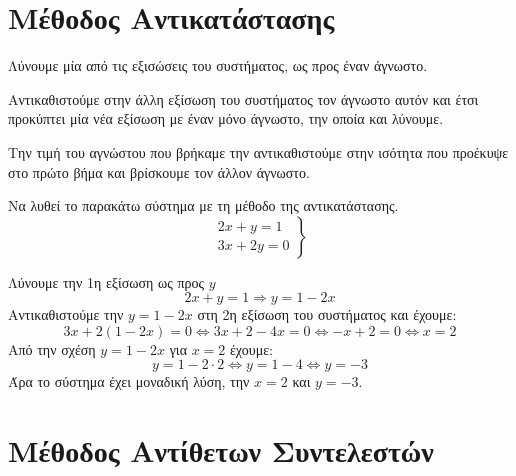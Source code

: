 \documentclass[a4paper,table]{report}
\begin{document}
\begin{center}
  \minibox{\large\bfseries \textcolor{Col1}{Γραμμικά Συστήματα 2 x 2}}
\end{center}

\vspace{\baselineskip}


\section*{Μέθοδος Αντικατάστασης}

\begin{mybox2}
  \item {}
\begin{myitemize}
  \item Λύνουμε μία από τις εξισώσεις του συστήματος, ως προς έναν άγνωστο.
  \item Αντικαθιστούμε στην άλλη εξίσωση του συστήματος τον άγνωστο αυτόν και έτσι 
    προκύπτει μία νέα εξίσωση με έναν μόνο άγνωστο, την οποία και λύνουμε.
  \item Την τιμή του αγνώστου που βρήκαμε την αντικαθιστούμε στην ισότητα που προέκυψε
    στο πρώτο βήμα και βρίσκουμε τον άλλον άγνωστο.
\end{myitemize}
\end{mybox2}

\begin{example} 
  Να λυθεί το παρακάτω σύστημα με τη μέθοδο της αντικατάστασης.
  \[
    \left.
      \begin{matrix}
        2x+y=1 \\
        3x+2y=0
      \end{matrix} 
    \right\} 
  \] 
\end{example}
\begin{solution}
  Λύνουμε την 1η εξίσωση ως προς $y$
  \[
    2x+y=1 \Rightarrow y=1-2x 
  \]
  Αντικαθιστούμε την $ y=1-2x $ στη 2η εξίσωση του συστήματος και έχουμε:
  \[
    3x+2(1-2x) = 0 \Leftrightarrow 3x+2-4x=0 \Leftrightarrow -x+2=0 \Leftrightarrow x=2 
  \]
  Από την σχέση $ y= 1-2x $ για $ x=2 $ έχουμε:
  \[
    y=1-2\cdot 2 \Leftrightarrow y = 1-4 \Leftrightarrow y = -3 
  \] 
  Άρα το σύστημα έχει μοναδική λύση, την $ x=2 $ και $ y=-3 $.
\end{solution}


\section*{Μέθοδος Αντίθετων Συντελεστών}
\end{document}
